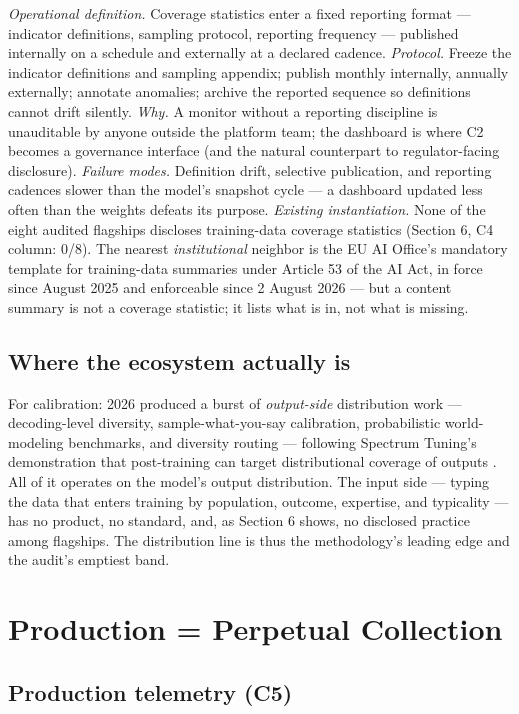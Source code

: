 \documentclass[10pt]{article}
\begin{document}
\emph{Operational definition.} Coverage statistics enter a fixed reporting format --- indicator definitions, sampling protocol, reporting frequency --- published internally on a schedule and externally at a declared cadence. \emph{Protocol.} Freeze the indicator definitions and sampling appendix; publish monthly internally, annually externally; annotate anomalies; archive the reported sequence so definitions cannot drift silently. \emph{Why.} A monitor without a reporting discipline is unauditable by anyone outside the platform team; the dashboard is where C2 becomes a governance interface (and the natural counterpart to regulator-facing disclosure). \emph{Failure modes.} Definition drift, selective publication, and reporting cadences slower than the model's snapshot cycle --- a dashboard updated less often than the weights defeats its purpose. \emph{Existing instantiation.} None of the eight audited flagships discloses training-data coverage statistics (Section 6, C4 column: 0/8). The nearest \emph{institutional} neighbor is the EU AI Office's mandatory template for training-data summaries under Article 53 of the AI Act, in force since August 2025 and enforceable since 2 August 2026 \cite{ref17} --- but a content summary is not a coverage statistic; it lists what is in, not what is missing.

\subsection{Where the ecosystem actually is}

For calibration: 2026 produced a burst of \emph{output-side} distribution work --- decoding-level diversity, sample-what-you-say calibration, probabilistic world-modeling benchmarks, and diversity routing --- following Spectrum Tuning's demonstration that post-training can target distributional coverage of outputs \cite{ref7}. All of it operates on the model's output distribution. The input side --- typing the data that enters training by population, outcome, expertise, and typicality --- has no product, no standard, and, as Section 6 shows, no disclosed practice among flagships. The distribution line is thus the methodology's leading edge and the audit's emptiest band.

\section{Production = Perpetual Collection}

\subsection{Production telemetry (C5)}
\end{document}
